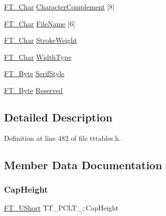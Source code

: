 \begin{DoxyCompactItemize}
\item 
\mbox{\hyperlink{fttypes_8h_a0f851552b050883885f0a0855771f39d}{F\+T\+\_\+\+Char}} \mbox{\hyperlink{struct_t_t___p_c_l_t___a2641686beb550bcf8d9e598336f0acd9}{Character\+Complement}} \mbox{[}8\mbox{]}
\item 
\mbox{\hyperlink{fttypes_8h_a0f851552b050883885f0a0855771f39d}{F\+T\+\_\+\+Char}} \mbox{\hyperlink{struct_t_t___p_c_l_t___a87691bde7cb06e3043f5320c8223e768}{File\+Name}} \mbox{[}6\mbox{]}
\item 
\mbox{\hyperlink{fttypes_8h_a0f851552b050883885f0a0855771f39d}{F\+T\+\_\+\+Char}} \mbox{\hyperlink{struct_t_t___p_c_l_t___aaf28b05ac07bcdc1ae6f4ec9064434fc}{Stroke\+Weight}}
\item 
\mbox{\hyperlink{fttypes_8h_a0f851552b050883885f0a0855771f39d}{F\+T\+\_\+\+Char}} \mbox{\hyperlink{struct_t_t___p_c_l_t___ad6613ad7556599343f999a7d27a0f1d0}{Width\+Type}}
\item 
\mbox{\hyperlink{fttypes_8h_a51f26183ca0c9f4af958939648caeccd}{F\+T\+\_\+\+Byte}} \mbox{\hyperlink{struct_t_t___p_c_l_t___aa8e3d35937660a1e4959ee10a4800e6a}{Serif\+Style}}
\item 
\mbox{\hyperlink{fttypes_8h_a51f26183ca0c9f4af958939648caeccd}{F\+T\+\_\+\+Byte}} \mbox{\hyperlink{struct_t_t___p_c_l_t___a2e46e3f5eaa51e02d831d3f6143f8846}{Reserved}}
\end{DoxyCompactItemize}


\subsection{Detailed Description}


Definition at line 482 of file tttables.\+h.



\subsection{Member Data Documentation}
\mbox{\label{struct_t_t___p_c_l_t___a754d840e5bcf6011459de635aa38d728}} 
\subsubsection{\texorpdfstring{CapHeight}{CapHeight}}
{\footnotesize\ttfamily \mbox{\hyperlink{fttypes_8h_a937f6c17cf5ffd09086d8610c37b9f58}{F\+T\+\_\+\+U\+Short}} T\+T\+\_\+\+P\+C\+L\+T\+\_\+\+::\+Cap\+Height}



